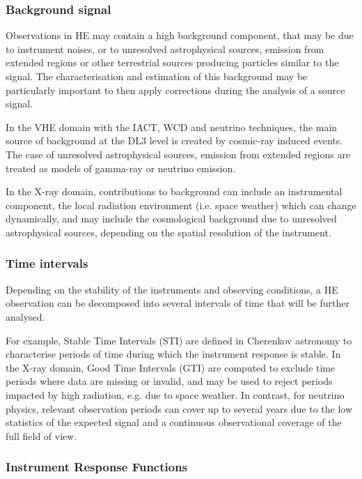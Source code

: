 \documentclass[11pt,a4paper]{ivoa}
\begin{document}
\subsubsection{Background signal}

Observations in HE may contain a high background component, that may be due to instrument noises, or to unresolved astrophysical sources, emission from extended regions or other terrestrial sources producing particles similar to the signal. The characterisation and estimation of this background may be particularly important to then apply corrections during the analysis of a source signal.

In the VHE domain with the IACT, WCD and neutrino techniques, the main source of background at the DL3 level is created by cosmic-ray induced events. The case of unresolved astrophysical sources, emission from extended regions are treated as models of gamma-ray or neutrino emission.

In the X-ray domain, contributions to background can include an instrumental component, the local radiation environment (i.e. space weather) which can change dynamically, and may include the cosmological background due to unresolved astrophysical sources, depending on the spatial resolution of the instrument.


\subsubsection{Time intervals}

Depending on the stability of the instruments and observing conditions, a HE observation can be decomposed into several intervals of time that will be further analysed.

For example, Stable Time Intervals (STI) are defined in Cherenkov astronomy to characterise periods of time during which the instrument response is stable. In the X-ray domain, Good Time Intervals (GTI) are computed to exclude time periods where data are missing or invalid, and may be used to reject periods impacted by high radiation, e.g. due to space weather. In contrast, for neutrino physics, relevant observation periods can cover up to several years due to the low statistics of the expected signal and a continuous observational coverage of the full field of view.


\subsubsection{Instrument Response Functions}
\end{document}
